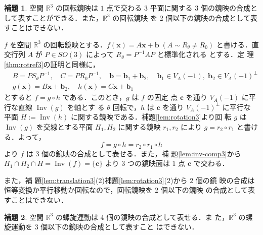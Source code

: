\documentclass[11pt, uplatex, dvipdfmx, titlepage]{jsarticle}
\makeatletter
\DeclareMathOperator{\Inv}{Inv}
\renewenvironment{proof}[1][\proofname]{\par
  \pushQED{\qed}%
  \normalfont \topsep6\p@\@plus6\p@\relax
  \trivlist
  \item[\hskip\labelsep
         \bfseries
    {#1}]\ignorespaces
}{%
  \popQED\endtrivlist\@endpefalse
}
\theoremstyle{definition}
\newtheorem{lemma}{補題}[section]
\renewcommand{\proofname}{\textbf{証明}}
\makeatother
\begin{document}
\begin{lemma}\label{lem:rotref3}
  空間 $\mathbb{R}^3$ の回転鏡映は $1$ 点で交わる $3$ 平面に関する $3$
  個の鏡映の合成として表すことができる．また，$\mathbb{R}^3$ の回転鏡映
  を $2$ 個以下の鏡映の合成として表すことはできない．
\end{lemma}

\begin{proof}
  $f$ を空間 $\mathbb{R}^3$
  の回転鏡映とする．$f(\bm{x}) = A\bm{x} + \bm{b} \; \left( A \sim
    R_{\theta} \neq R_0 \right)$ と書ける．直交行列 $A$ が $P \in
  SO(3)$ によって $R_{\theta} = P^{-1} A P$ と標準化される とする．定
  理\ref{thm:rotref3}の証明と同様に，
  \begin{align*}
    &B=PS_{\theta}P^{-1}, \quad C=PR_{0}P^{-1}, \quad 
    \bm{b} = \bm{b}_1 + \bm{b}_2, \quad \bm{b}_1 \in V_A(-1), \; \bm{b}_2 \in V_A(-1)^{\perp}\\
    &g(\bm{x})=B\bm{x} + \bm{b}_2, \quad h(\bm{x})=C\bm{x}+\bm{b}_1
  \end{align*}
  とすると $f = g \circ h$ である．このとき，$g$ は $f$ の固定
  点 $\bm{c}$ を通り $V_A(-1)$ に平行な直線 $\Inv(g)$ を軸とす
  る $\theta$ 回転で，$h$ は $\bm{c}$ を通り $V_A(-1)^{\perp}$ に平行な
  平面 $H:=\Inv(h)$ に関する鏡映である．補題\ref{lem:rotation3}より回
  転 $g$ は $\Inv(g)$ を交線とする平面 $H_1, H_2$ に関する鏡映 $r_1,
  r_2$ により $g=r_2 \circ r_1$ と書ける．よって，
  \[
    f = g \circ h = r_2 \circ r_1 \circ h
  \]
  より $f$ は $3$ 個の鏡映の合成として表せる．また，補
  題\ref{lem:inv-comp3}から $H_1 \cap H_2 \cap H = \Inv(f)=\{\bm{c}\}$
  より $3$ つの鏡映面は $1$ 点 $\bm{c}$ で交わる．
  
  また，補
  題\ref{lem:translation3}(2)補題\ref{lem:rotation3}(2)から $2$ 個の鏡
  映の合成は恒等変換か平行移動か回転なので，回転鏡映を $2$ 個以下の鏡映
  の合成として表すことはできない．
\end{proof}

\begin{lemma}\label{lem:spiral3}
  空間 $\mathbb{R}^3$ の螺旋運動は $4$ 個の鏡映の合成として表せる．ま
  た，$\mathbb{R}^3$ の螺旋運動を $3$ 個以下の鏡映の合成として表すこと
  はできない．
\end{lemma}
\end{document}

